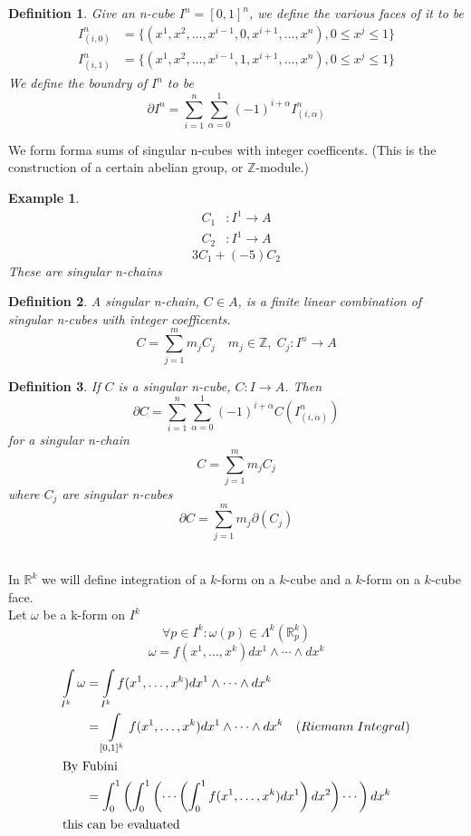 \documentclass[11pt]{article}
\def\RR{\mathbb{R}}
\def\ZZ{\mathbb{Z}}
\newtheorem{definition}{Definition}[section]
\newtheorem{example}{Example}[section]
\begin{document}
\begin{definition}
Give an n-cube $I^n = [0,1]^n$, we define the various faces of it to be 
\begin{align*}
I_{(i,0)}^n &= \{(x^1, x^2, \dots , x^{i-1}, 0 , x^{i+1}, \dots , x^n), 0 \leq x^j \leq 1\} \\
I_{(i,1)}^n &= \{(x^1, x^2, \dots , x^{i-1}, 1 , x^{i+1}, \dots , x^n), 0 \leq x^j \leq 1\}
\end{align*}
We define the boundry of $I^n$ to be 
\[\partial I^n = \sum_{i=1}^n\sum_{\alpha=0}^{1}(-1)^{i+\alpha} I_{(i,\alpha)}^n \]
\end{definition}

We form forma sums of singular n-cubes with integer coefficents. (This is the construction of a certain abelian group, or $\ZZ$-module.)
\begin{example}
\begin{align*}
C_1&:I^1 \rightarrow A\\
C_2&:I^1 \rightarrow A
\end{align*}
\[3C_1 + (-5)C_2 \]
These are singular n-chains 
\end{example}

\begin{definition}
A singular n-chain, $C \in A$, is a finite linear combination of singular n-cubes with integer coefficents. 
\[ C = \sum_{j=1}^{m} m_j C_j \quad m_j \in \ZZ, \; C_j:I^n \rightarrow A \]
\end{definition}

\begin{definition}
If $C$ is a singular n-cube, $C:I\rightarrow A$. Then
\[\partial C = \sum_{i=1}^{n}\sum_{\alpha=0}^{1} (-1)^{i+\alpha}C(I_{(i,\alpha)}^{n})\]
for a singular n-chain 
\[ C = \sum_{j=1}^{m} m_j C_j \]
where $C_j$ are singular n-cubes
\[ \partial C = \sum_{j=1}^{m} m_j \partial (C_j) \]
\end{definition}

\quad \\
In  $\RR^k$ we will define integration of a $k$-form on a $k$-cube and a $k$-form on a $k$-cube face.\\


Let $\omega$ be a k-form on $I^k$
\[\forall p \in I^k : \omega(p) \in \Lambda^k(\RR_p^k)\]
\[\omega = f(x^1, \dots, x^k)dx^1 \wedge \cdots \wedge dx^k \]
\begin{align*}
\int\limits_{I^k} \omega &= \int\limits_{I^k} f(x^1, \dots, x^k)dx^1 \wedge \cdots \wedge dx^k \\
&= \int\limits_{[0,1]^k} f(x^1, \dots, x^k)dx^1 \wedge \cdots \wedge dx^k \quad (Riemann \; Integral)\\
\intertext{By Fubini}
&= \int_0^1\left( \int_0^1\left( \cdots \left( \int_0^1 f(x^1, \dots, x^k)dx^1 \right) dx^2 \right) \cdots \right) dx^k\\
\intertext{this can be evaluated}
\end{align*}
\end{document}
